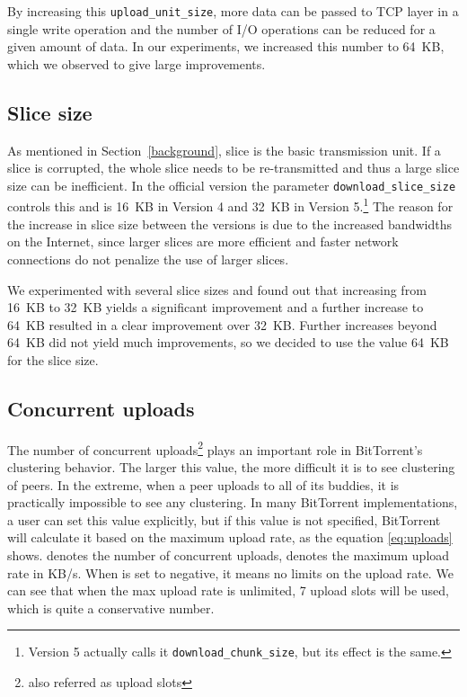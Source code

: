 \documentclass[10pt,letterpaper,twocolumn]{article}
\begin{document}
By increasing this \texttt{upload\_unit\_size}, more data can be passed to TCP
layer in a single write operation and the number of I/O operations can
be reduced for a given amount of data. In our experiments, we
increased this number to 64~KB, which we observed to give large improvements.

\subsection{Slice size}
\label{sec:slice-size}

As mentioned in Section~\ref{background}, slice is the basic
transmission unit. If a slice is corrupted, the whole slice needs to
be re-transmitted and thus a large slice size can be inefficient. In
the official version the parameter \texttt{download\_slice\_size}
controls this and is 16~KB in Version 4 and 32~KB in Version
5.\footnote{Version 5 actually calls it
  \texttt{download\_chunk\_size}, but its effect is the same.} The
reason for the increase in slice size between the versions is due to
the increased bandwidths on the Internet, since larger slices are more
efficient and faster network connections do not penalize the use of
larger slices.
  








We experimented with several slice sizes and found out that increasing
from 16~KB to 32~KB yields a significant improvement and a further
increase to 64~KB resulted in a clear improvement over 32~KB. Further
increases beyond 64~KB did not yield much improvements, so we decided
to use the value 64~KB for the slice size.



\subsection{Concurrent uploads}
\label{concurrent_uploads}

The number of concurrent uploads\footnote{also referred as upload
  slots} plays an important role in BitTorrent's clustering behavior.
The larger this value, the more difficult it is to see clustering of
peers. In the extreme, when a peer uploads to all of its buddies, it
is practically impossible to see any clustering. In many BitTorrent
implementations, a user can set this value explicitly, but if this
value is not specified, BitTorrent will calculate it based on the
maximum upload rate, as the equation \eqref{eq:uploads} shows.
 denotes the number of concurrent uploads,  denotes the
maximum upload rate in KB/s. When  is set to negative, it means
no limits on the upload rate. We can see that when the max upload rate
is unlimited, 7 upload slots will be used, which is quite a
conservative number.
\end{document}
